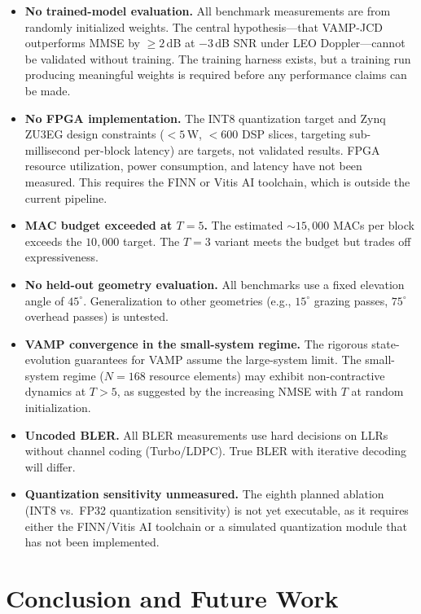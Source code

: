 \documentclass{article}
\begin{document}
\begin{itemize}
  \item \textbf{No trained-model evaluation.} All benchmark measurements are from randomly initialized weights. The central hypothesis---that VAMP-JCD outperforms MMSE by $\geq 2$\,dB at $-3$\,dB SNR under LEO Doppler---cannot be validated without training. The training harness exists, but a training run producing meaningful weights is required before any performance claims can be made.
  \item \textbf{No FPGA implementation.} The INT8 quantization target and Zynq ZU3EG design constraints ($<5$\,W, $<600$ DSP slices, targeting sub-millisecond per-block latency) are targets, not validated results. FPGA resource utilization, power consumption, and latency have not been measured. This requires the FINN or Vitis AI toolchain, which is outside the current pipeline.
  \item \textbf{MAC budget exceeded at $T=5$.} The estimated $\sim 15{,}000$ MACs per block exceeds the $10{,}000$ target. The $T=3$ variant meets the budget but trades off expressiveness.
  \item \textbf{No held-out geometry evaluation.} All benchmarks use a fixed elevation angle of $45^\circ$. Generalization to other geometries (e.g., $15^\circ$ grazing passes, $75^\circ$ overhead passes) is untested.
  \item \textbf{VAMP convergence in the small-system regime.} The rigorous state-evolution guarantees for VAMP assume the large-system limit. The small-system regime ($N=168$ resource elements) may exhibit non-contractive dynamics at $T > 5$, as suggested by the increasing NMSE with $T$ at random initialization.
  \item \textbf{Uncoded BLER.} All BLER measurements use hard decisions on LLRs without channel coding (Turbo/LDPC). True BLER with iterative decoding will differ.
  \item \textbf{Quantization sensitivity unmeasured.} The eighth planned ablation (INT8 vs.\ FP32 quantization sensitivity) is not yet executable, as it requires either the FINN/Vitis AI toolchain or a simulated quantization module that has not been implemented.
\end{itemize}

\section{Conclusion and Future Work}
\label{sec:conclusion}
\end{document}
